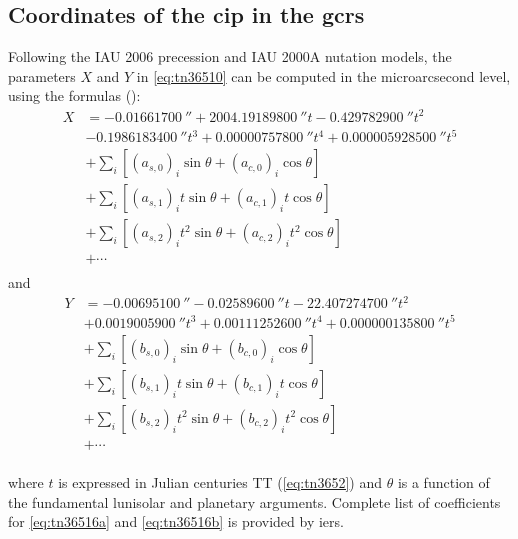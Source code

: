 \subsection{Coordinates of the \gls{cip} in the \gls{gcrs}}
\label{ssec:coordinates-of-the-cip-in-the-gcrs}
Following the IAU 2006 precession and IAU 2000A nutation models, the parameters 
\(X\) and \(Y\) in \ref{eq:tn36510} can be computed in the microarcsecond level, 
using the formulas (\cite{iers2010}):
\begin{equation}
  \label{eq:tn36516a}
  \begin{aligned}
  X &= \SI{-0.01661700}{\arcsecond} + \SI{2004.19189800}{\arcsecond} t - \SI{0.429782900}{\arcsecond} t^2 \\
  &- \SI{0.1986183400}{\arcsecond}t^3 + \SI{0.00000757800}{\arcsecond} t^4 + \SI{0.000005928500}{\arcsecond} t^5 \\
  &+ \sum_{i} \left[ (a_{s,0})_i \sin \theta + (a_{c,0})_i \cos \theta \right] \\ 
  &+ \sum_{i} \left[ (a_{s,1})_i t \sin \theta + (a_{c,1})_i t \cos \theta \right] \\ 
  &+ \sum_{i} \left[ (a_{s,2})_i t^2 \sin \theta + (a_{c,2})_i t^2 \cos \theta \right] \\ 
  &+ \cdots \\
  \end{aligned}
\end{equation}
and
\begin{equation}
  \label{eq:tn36516b}
  \begin{aligned}
  Y &= -\SI{0.00695100}{\arcsecond} - \SI{0.02589600}{\arcsecond} t - \SI{22.407274700}{\arcsecond} t^2 \\
  &+ \SI{0.0019005900}{\arcsecond} t^3 + \SI{0.00111252600}{\arcsecond} t^4 + \SI{0.000000135800}{\arcsecond} t^5 \\
  &+ \sum_{i} \left[ (b_{s,0})_i \sin \theta     + (b_{c,0})_i \cos \theta \right] \\ 
  &+ \sum_{i} \left[ (b_{s,1})_i t \sin \theta   + (b_{c,1})_i t \cos \theta \right] \\ 
  &+ \sum_{i} \left[ (b_{s,2})_i t^2 \sin \theta + (b_{c,2})_i t^2 \cos \theta \right] \\ 
  &+ \cdots \\
  \end{aligned}
\end{equation}

where \(t\) is expressed in Julian centuries TT (\ref{eq:tn3652}) and \(\theta\) 
is a function of the fundamental lunisolar and planetary arguments. Complete 
list of coefficients for \ref{eq:tn36516a} and \ref{eq:tn36516b} is provided 
by \gls{iers}. 

